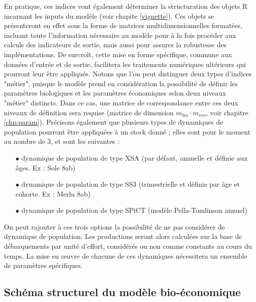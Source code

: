 \documentclass[12pt, colorinlistoftodos, notitlepage]{report}
\newenvironment{not used}[1]{%
    \longtable{%
        |>{\centering$\displaystyle}A{#1}{1}<{$}%
        |}\hline\ignorespaces}{%
    \endlongtable\ignorespacesafterend}
\begin{document}
En pratique, ces indices vont également déterminer la structuration des objets R incarnant les inputs du modèle (voir chapite \ref{vignette}). 
Ces objets se présenteront en effet sous la forme de matrices multidimensionnelles formatées, incluant toute l'information nécessaire au modèle pour à la fois procéder aux calculs des indicateurs de sortie, mais aussi pour assurer la robustesse des implémentations. De surcroît, cette mise en forme spécifique, commune aux données d'entrée et de sortie, facilitera les traitements numériques ultérieurs qui pourront leur être appliqués. Notons que l'on peut distinguer deux types d'indices "métier", puisque le modèle prend en considération la possibilité de définir les paramètres biologiques et les paramètres économiques selon deux niveaux "métier" distincts. Dans ce cas, une matrice de correspondance entre ces deux niveaux de définition sera requise (matrice de dimension $m_{bio} \cdot m_{eco}$, voir chapitre \ref{chp:param}). 
Précisons également que plusieurs types de dynamiques de population pourront être appliquées à un stock donné ; elles sont pour le moment au nombre de 3, et sont les suivantes :

\begin{itemize}
    \item[$\bullet$] dynamique de population de type XSA (par défaut, annuelle et définie aux âges. Ex : Sole 8ab)
    \item[$\bullet$] dynamique de population de type SS3 (trimestrielle et définie par âge et cohorte. Ex : Merlu 8ab)
    \item[$\bullet$] dynamique de population de type SPiCT (modèle Pella-Tomlinson annuel)
\end{itemize}

On peut rajouter à ces trois options la possibilité de ne pas considérer de dynamique de population. Les productions seront alors calculées sur la base de débarquements par unité d'effort, considérés ou non comme constants au cours du temps. La mise en œuvre de chacune de ces dynamiques nécessitera un ensemble de paramètres spécifiques. 

\subsection{Schéma structurel du modèle bio-économique}
\end{document}
